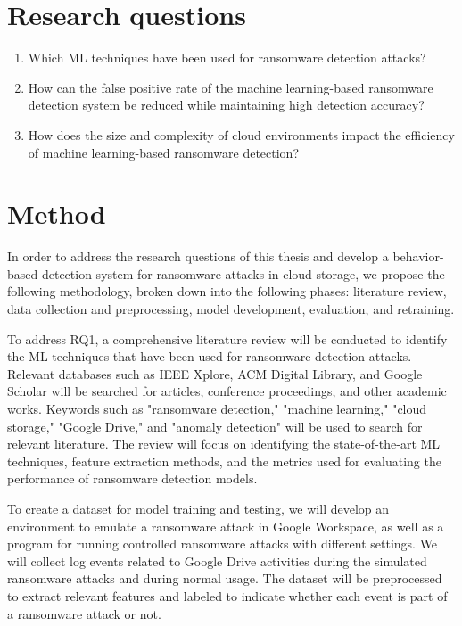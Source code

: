 \documentclass[12pt,a4paper,twoside]{article}
\begin{document}
\section{Research questions}
\label{sec:rq}
    \begin{enumerate}

        \item Which ML techniques have been used for ransomware detection attacks?
        \item How can the false positive rate of the machine learning-based ransomware detection system be reduced while maintaining high detection accuracy?
        \item How does the size and complexity of cloud environments impact the efficiency of machine learning-based ransomware detection?
    \end{enumerate}

\section{Method}
\label{sec:method}


In order to address the research questions of this thesis and develop a behavior-based detection system for ransomware attacks in cloud storage, we propose the following methodology, broken down into the following phases: literature review, data collection and preprocessing, model development, evaluation, and retraining.



To address RQ1, a comprehensive literature review will be conducted to identify the ML techniques that have been used for ransomware detection attacks. Relevant databases such as IEEE Xplore, ACM Digital Library, and Google Scholar will be searched for articles, conference proceedings, and other academic works. Keywords such as "ransomware detection," "machine learning," "cloud storage," "Google Drive," and "anomaly detection" will be used to search for relevant literature. The review will focus on identifying the state-of-the-art ML techniques, feature extraction methods, and the metrics used for evaluating the performance of ransomware detection models.

To create a dataset for model training and testing, we will develop an environment to emulate a ransomware attack in Google Workspace, as well as a program for running controlled ransomware attacks with different settings. We will collect log events related to Google Drive activities during the simulated ransomware attacks and during normal usage. The dataset will be preprocessed to extract relevant features and labeled to indicate whether each event is part of a ransomware attack or not.
\end{document}
